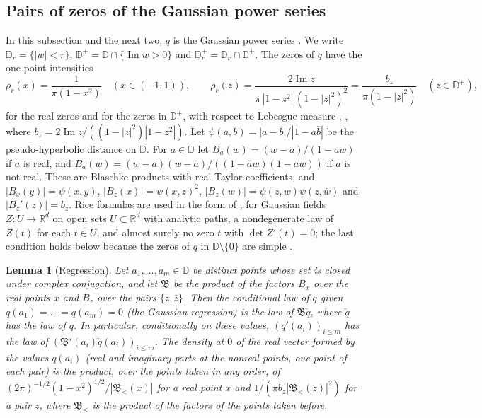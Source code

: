 \documentclass[11pt]{amsart}
\newtheorem{lemma}[theorem]{Lemma}
\theoremstyle{definition}
\theoremstyle{remark}
\numberwithin{equation}{section}
\newcommand{\R}{\mathbb{R}}
\newcommand{\D}{\mathbb{D}}
\DeclareMathOperator{\im}{Im}
\begin{document}
\subsection{Pairs of zeros of the Gaussian power series}\label{subsec:pairs}
In this subsection and the next two, $q$ is the Gaussian power series \cite[\eqref{M-eq:kac}]{Main}. We write $\D_r=\{|w|<r\}$, $\D^+=\D\cap\{\im w>0\}$ and $\D_r^+=\D_r\cap\D^+$. The zeros of $q$ have the one-point intensities
\[
\rho_r(x)=\frac1{\pi(1-x^2)}\quad(x\in(-1,1)),\qquad\rho_c(z)=\frac{2\im z}{\pi\,|1-z^2|\,(1-|z|^2)^2}=\frac{b_z}{\pi(1-|z|^2)}\quad(z\in\D^+),
\]
for the real zeros and for the zeros in $\D^+$, with respect to Lebesgue measure \cite[Theorems~2.1 and~2.7]{MS}, \cite[Lemma~\ref{M-lem:pairs}]{Main}, where $b_z=2\im z/((1-|z|^2)|1-z^2|)$. Let $\psi(a,b)=|a-b|/|1-a\bar b|$ be the pseudo-hyperbolic distance on $\D$. For $a\in\D$ let $B_a(w)=(w-a)/(1-aw)$ if $a$ is real, and $B_a(w)=(w-a)(w-\bar a)/((1-\bar aw)(1-aw))$ if $a$ is not real. These are Blaschke products with real Taylor coefficients, and $|B_x(y)|=\psi(x,y)$, $|B_z(x)|=\psi(x,z)^2$, $|B_z(w)|=\psi(z,w)\psi(z,\bar w)$ and $|B_z'(z)|=b_z$. Rice formulas are used in the form of \cite[Theorem~6.2]{AW}%
, for Gaussian fields $Z:U\to\R^d$ on open sets $U\subset\R^d$ with analytic paths, a nondegenerate law of $Z(t)$ for each $t\in U$, and almost surely no zero $t$ with $\det Z'(t)=0$; the last condition holds below because the zeros of $q$ in $\D\setminus\{0\}$ are simple \cite[Lemma~\ref{M-lem:resample}]{Main}.

\begin{lemma}[Regression]\label{lem:regression}
Let $a_1,\dots,a_m\in\D$ be distinct points whose set is closed under complex conjugation, and let $\mathfrak B$ be the product of the factors $B_x$ over the real points $x$ and $B_z$ over the pairs $\{z,\bar z\}$. Then the conditional law of $q$ given $q(a_1)=\dots=q(a_m)=0$ (the Gaussian regression) is the law of $\mathfrak B\check q$, where $\check q$ has the law of $q$. In particular, conditionally on these values, $(q'(a_i))_{i\le m}$ has the law of $(\mathfrak B'(a_i)\check q(a_i))_{i\le m}$. The density at $0$ of the real vector formed by the values $q(a_i)$ (real and imaginary parts at the nonreal points, one point of each pair) is the product, over the points taken in any order, of $(2\pi)^{-1/2}(1-x^2)^{1/2}/|\mathfrak B_<(x)|$ for a real point $x$ and $1/(\pi b_z|\mathfrak B_<(z)|^2)$ for a pair $z$, where $\mathfrak B_<$ is the product of the factors of the points taken before.
\end{lemma}
\end{document}
